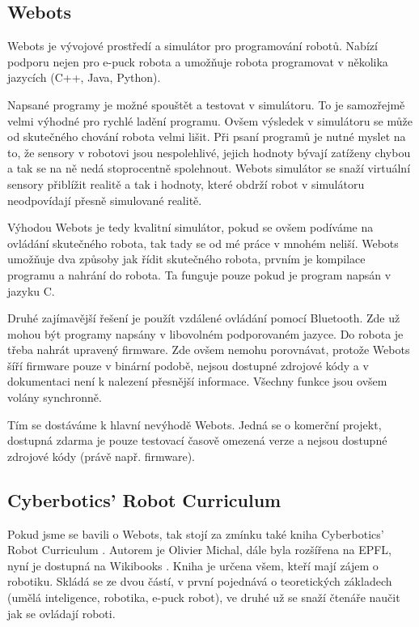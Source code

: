 \documentclass[12pt,notitlepage]{report}
\begin{document}
        \subsection{Webots}
        \label{webots}

        Webots \cite{webots} je vývojové prostředí a simulátor pro programování robotů.
        Nabízí podporu nejen pro e-puck robota a umožňuje robota programovat v
        několika jazycích (C++, Java, Python).

        Napsané programy je možné spouštět a testovat v simulátoru. To je
        samozřejmě velmi výhodné pro rychlé ladění programu. Ovšem výsledek v
        simulátoru se může od skutečného chování robota velmi lišit. Při psaní
        programů je nutné myslet na to, že sensory v robotovi jsou
        nespolehlivé, jejich hodnoty bývají zatíženy chybou a tak se na ně nedá
        stoprocentně spolehnout. Webots simulátor se snaží virtuální sensory
        přiblížit realitě a tak i hodnoty, které obdrží robot v simulátoru
        neodpovídají přesně simulované realitě.

        Výhodou Webots je tedy kvalitní simulátor, pokud se ovšem podíváme na
        ovládání skutečného robota, tak tady se od mé práce v mnohém neliší.
        Webots umožňuje dva způsoby jak řídit skutečného robota, prvním je
        kompilace programu a nahrání do robota. Ta funguje pouze pokud je
        program napsán v jazyku C.

        Druhé zajímavější řešení je použít vzdálené ovládání pomocí
        Bluetooth. Zde už mohou být programy napsány v libovolném podporovaném
        jazyce. Do robota je třeba nahrát upravený firmware. Zde ovšem nemohu
        porovnávat, protože Webots šíří firmware pouze v binární podobě, nejsou
        dostupné zdrojové kódy a v dokumentaci není k nalezení přesnější
        informace. Všechny funkce jsou ovšem volány synchronně.

        Tím se dostáváme k hlavní nevýhodě Webots. Jedná se o komerční projekt,
        dostupná zdarma je pouze testovací časově omezená verze a nejsou
        dostupné zdrojové kódy (právě např. firmware).

        \subsection{Cyberbotics' Robot Curriculum}
        \label{curriculum}

        Pokud jsme se bavili o Webots, tak stojí za zmínku také kniha
        Cyberbotics' Robot Curriculum \cite{cyberbotics}. Autorem je Olivier
        Michal, dále byla rozšířena na EPFL, nyní je dostupná na
        Wikibooks \cite{wikibooks}. Kniha je určena všem, kteří mají zájem o
        robotiku. Skládá se ze dvou částí, v první pojednává o teoretických
        základech (umělá inteligence, robotika, e-puck robot), ve druhé už se
        snaží čtenáře naučit jak se ovládají roboti.
\end{document}
